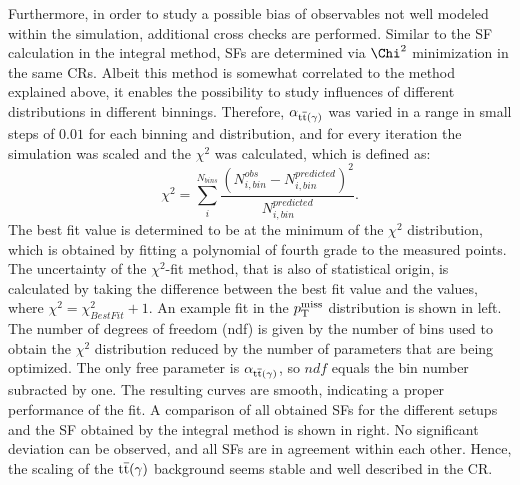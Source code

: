 Furthermore, in order to study a possible bias of observables not well modeled within the simulation, additional cross checks are performed. Similar to the SF calculation in the integral method, SFs are determined via $\Chi^2$ minimization in the same CRs. Albeit this method is somewhat correlated to the method explained above, it enables the possibility to study influences of different distributions in different binnings. Therefore, $\alpha_{{\mathrm{t}\overline{\mathrm{t}}}(\gamma)}$ was varied in a range in small steps of $0.01$ for each binning and distribution, and for every iteration the simulation was scaled and the $\chi^2$ was calculated, which is defined as:
\begin{equation}
 \chi^2=\sum_i^{N_{bins}} \frac{\left(N_{i,bin}^{obs}-N_{i,bin}^{predicted}\right)^2}{N_{i,bin}^{predicted}}.
\end{equation}
The best fit value is determined to be at the minimum of the $\chi^2$ distribution, which is obtained by fitting a polynomial of fourth grade to the measured points. The uncertainty of the $\chi^2$-fit method, that is also of statistical origin, is calculated by taking the difference between the best fit value and the values, where $\chi^2=\chi^2_{BestFit}+1$. An example fit in the $p_{\mathrm{T}}^\text{miss}$ distribution is shown in  left. The number of degrees of freedom (ndf) is given by the number of bins used to obtain the $\chi^2$ distribution reduced by the number of parameters that are being optimized. The only free parameter is $\alpha_{{\mathrm{t}\overline{\mathrm{t}}}(\gamma)}$, so $ndf$ equals the bin number subracted by one. The resulting curves are smooth, indicating a proper performance of the fit. A comparison of all obtained SFs for the different setups and the SF obtained by the integral method is shown in  right. No significant deviation can be observed, and all SFs are in agreement within each other. Hence, the scaling of the ${\mathrm{t}\overline{\mathrm{t}}}(\gamma)$ background seems stable and well described in the CR.
